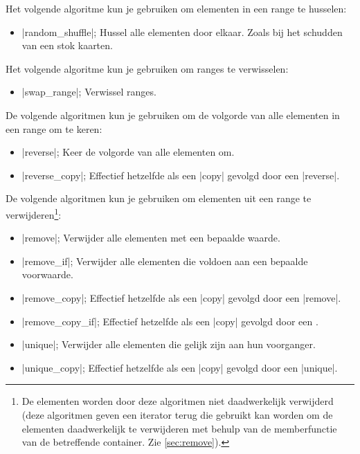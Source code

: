 \begin{cpplstShortInline}
Het volgende algoritme kun je gebruiken om elementen in een range te husselen:
\begin{itemize}
	\item |random_shuffle|; Hussel alle elementen door elkaar.
	Zoals bij het schudden van een stok kaarten.
\end{itemize}

Het volgende algoritme kun je gebruiken om ranges te verwisselen:
\begin{itemize}
	\item |swap_range|; Verwissel ranges.
\end{itemize}

De volgende algoritmen kun je gebruiken om de volgorde van alle elementen in een range om te keren:
\begin{itemize}
	\item |reverse|; Keer de volgorde van alle elementen om.
	\item |reverse_copy|; Effectief hetzelfde als een |copy| gevolgd door een |reverse|.
\end{itemize}

De volgende algoritmen kun je gebruiken om elementen uit een range te verwijderen\footnote{%
	De elementen worden door deze algoritmen niet daadwerkelijk verwijderd (deze algoritmen geven een iterator terug die gebruikt kan worden om de elementen daadwerkelijk te verwijderen met behulp van de memberfunctie  van de betreffende container.
	Zie \cref{sec:remove}).
}:
\begin{itemize}
	\item |remove|; Verwijder alle elementen met een bepaalde waarde.
	\item |remove_if|; Verwijder alle elementen die voldoen aan een bepaalde voorwaarde.
	\item |remove_copy|; Effectief hetzelfde als een |copy| gevolgd door een |remove|.
	\item |remove_copy_if|; Effectief hetzelfde als een |copy| gevolgd door een .
	\item |unique|; Verwijder alle elementen die gelijk zijn aan hun voorganger.
	\item |unique_copy|; Effectief hetzelfde als een |copy| gevolgd door een |unique|.
\end{itemize}


\end{cpplstShortInline}
